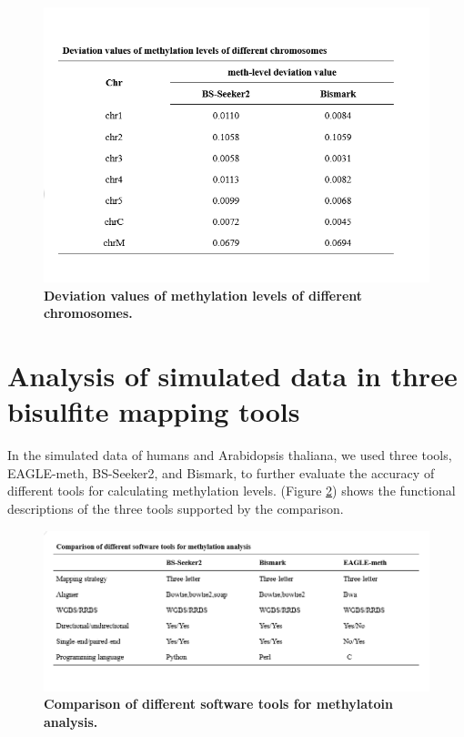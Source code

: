 \documentclass{PHlab-thesis}
\begin{document}
\begin{figure}[h]
  \centering
  \includegraphics[scale=0.8]{table/table5.png}
  \caption{\textbf{Deviation values of methylation levels of different chromosomes.}
  }
  \label{f12}
\end{figure}


\section{Analysis of simulated data in three bisulfite mapping tools}
In the simulated data of humans and Arabidopsis thaliana, we used three tools, EAGLE-meth, BS-Seeker2, and Bismark, to further evaluate the accuracy of different tools for calculating methylation levels. (Figure \ref{f13}) shows the functional descriptions of the three tools supported by the comparison.

\begin{figure}[h]
  \centering
  \includegraphics[scale=0.8]{table/table6.png}
  \caption{\textbf{Comparison of different software tools for methylatoin analysis.}}
  \label{f13}
\end{figure}
\end{document}
